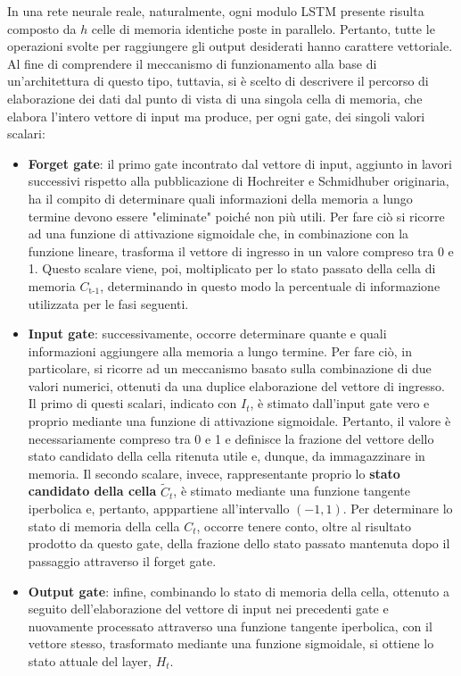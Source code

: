 In una rete neurale reale, naturalmente, ogni modulo LSTM presente risulta composto da $h$ celle di memoria identiche poste in parallelo. Pertanto, tutte le operazioni svolte per raggiungere gli output desiderati hanno carattere vettoriale. Al fine di comprendere il meccanismo di funzionamento alla base di un'architettura di questo tipo, tuttavia, si è scelto di descrivere il percorso di elaborazione dei dati dal punto di vista di una singola cella di memoria, che elabora l'intero vettore di input ma produce, per ogni gate, dei singoli valori scalari:

    \begin{itemize}

        \item \textbf{Forget gate}: il primo gate incontrato dal vettore di input, aggiunto in lavori successivi rispetto alla pubblicazione di Hochreiter e Schmidhuber originaria, ha il compito di determinare quali informazioni della memoria a lungo termine devono essere "eliminate" poiché non più utili. Per fare ciò si ricorre ad una funzione di attivazione sigmoidale che, in combinazione con la funzione lineare, trasforma il vettore di ingresso in un valore compreso tra 0 e 1. Questo scalare viene, poi, moltiplicato per lo stato passato della cella di memoria $C_{\text{t-1}}$, determinando in questo modo la percentuale di informazione utilizzata per le fasi seguenti. 
        
        \item \textbf{Input gate}: successivamente, occorre determinare quante e quali informazioni aggiungere alla memoria a lungo termine. Per fare ciò, in particolare, si ricorre ad un meccanismo basato sulla combinazione di due valori numerici, ottenuti da una duplice elaborazione del vettore di ingresso. Il primo di questi scalari, indicato con $I_{t}$, è stimato dall'input gate vero e proprio mediante una funzione di attivazione sigmoidale. Pertanto, il valore è necessariamente compreso tra 0 e 1 e definisce la frazione del vettore dello stato candidato della cella ritenuta utile e, dunque, da immagazzinare in memoria. Il secondo scalare, invece, rappresentante proprio lo \textbf{stato candidato della cella} $\tilde{C}_{t}$, è stimato mediante una funzione tangente iperbolica e, pertanto, apppartiene all'intervallo $(-1, 1)$. Per determinare lo stato di memoria della cella $C_{t}$, occorre  tenere conto, oltre al risultato prodotto da questo gate, della frazione dello stato passato mantenuta dopo il passaggio attraverso il forget gate.  

        \item \textbf{Output gate}: infine, combinando lo stato di memoria della cella, ottenuto a seguito dell'elaborazione del vettore di input nei precedenti gate e nuovamente processato attraverso una funzione tangente iperbolica, con il vettore stesso, trasformato mediante una funzione sigmoidale, si ottiene lo stato attuale del layer, $H_{t}$. 
        
    \end{itemize}

